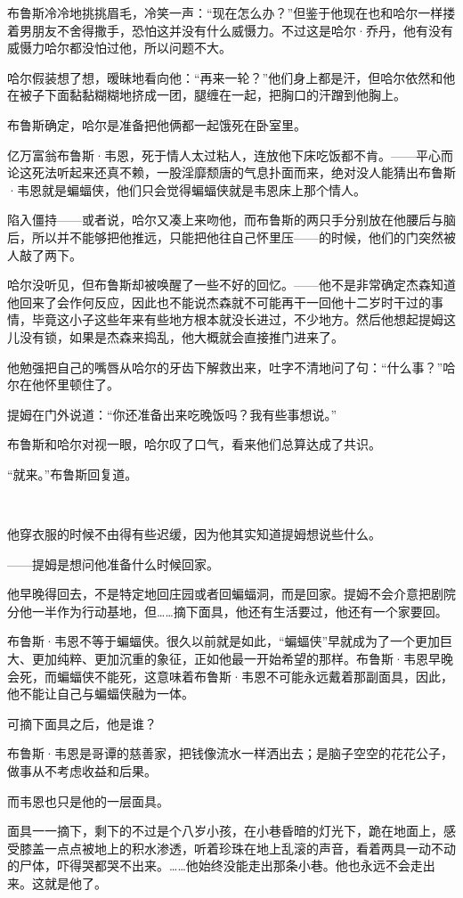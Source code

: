 \documentclass[../main]{subfiles}
\begin{document}
布鲁斯冷冷地挑挑眉毛，冷笑一声：“现在怎么办？”但鉴于他现在也和哈尔一样搂着男朋友不舍得撒手，恐怕这并没有什么威慑力。不过这是哈尔·乔丹，他有没有威慑力哈尔都没怕过他，所以问题不大。

哈尔假装想了想，暧昧地看向他：“再来一轮？”他们身上都是汗，但哈尔依然和他在被子下面黏黏糊糊地挤成一团，腿缠在一起，把胸口的汗蹭到他胸上。

布鲁斯确定，哈尔是准备把他俩都一起饿死在卧室里。

亿万富翁布鲁斯·韦恩，死于情人太过粘人，连放他下床吃饭都不肯。——平心而论这死法听起来还真不赖，一股淫靡颓唐的气息扑面而来，绝对没人能猜出布鲁斯·韦恩就是蝙蝠侠，他们只会觉得蝙蝠侠就是韦恩床上那个情人。

陷入僵持——或者说，哈尔又凑上来吻他，而布鲁斯的两只手分别放在他腰后与脑后，所以并不能够把他推远，只能把他往自己怀里压——的时候，他们的门突然被人敲了两下。

哈尔没听见，但布鲁斯却被唤醒了一些不好的回忆。——他不是非常确定杰森知道他回来了会作何反应，因此也不能说杰森就不可能再干一回他十二岁时干过的事情，毕竟这小子这些年来有些地方根本就没长进过，不少地方。然后他想起提姆这儿没有锁，如果是杰森来捣乱，他大概就会直接推门进来了。

他勉强把自己的嘴唇从哈尔的牙齿下解救出来，吐字不清地问了句：“什么事？”哈尔在他怀里顿住了。

提姆在门外说道：“你还准备出来吃晚饭吗？我有些事想说。”

布鲁斯和哈尔对视一眼，哈尔叹了口气，看来他们总算达成了共识。

“就来。”布鲁斯回复道。

~\

他穿衣服的时候不由得有些迟缓，因为他其实知道提姆想说些什么。

——提姆是想问他准备什么时候回家。

他早晚得回去，不是特定地回庄园或者回蝙蝠洞，而是回家。提姆不会介意把剧院分他一半作为行动基地，但……摘下面具，他还有生活要过，他还有一个家要回。

布鲁斯·韦恩不等于蝙蝠侠。很久以前就是如此，“蝙蝠侠”早就成为了一个更加巨大、更加纯粹、更加沉重的象征，正如他最一开始希望的那样。布鲁斯·韦恩早晚会死，而蝙蝠侠不能死，这意味着布鲁斯·韦恩不可能永远戴着那副面具，因此，他不能让自己与蝙蝠侠融为一体。

可摘下面具之后，他是谁？

布鲁斯·韦恩是哥谭的慈善家，把钱像流水一样洒出去；是脑子空空的花花公子，做事从不考虑收益和后果。

而韦恩也只是他的一层面具。

面具一一摘下，剩下的不过是个八岁小孩，在小巷昏暗的灯光下，跪在地面上，感受膝盖一点点被地上的积水渗透，听着珍珠在地上乱滚的声音，看着两具一动不动的尸体，吓得哭都哭不出来。……他始终没能走出那条小巷。他也永远不会走出来。这就是他了。
\end{document}
